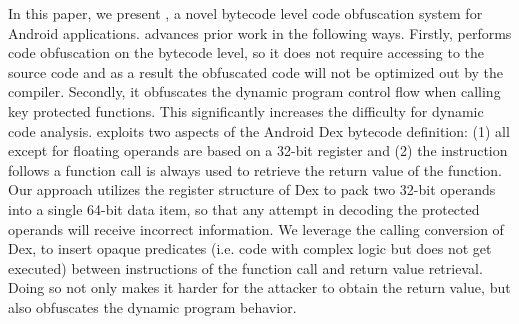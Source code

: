 %

In this paper, we present \ToolName, a novel bytecode level code obfuscation system for Android applications. \ToolName advances prior work in the following ways. Firstly, \ToolName performs code obfuscation on the bytecode level, so it does not require accessing to the source code and as a result the obfuscated code will not be optimized out by the compiler. Secondly, it obfuscates the dynamic program control flow when calling key protected functions. This significantly increases the difficulty for dynamic code analysis. \ToolName exploits two aspects of the Android Dex bytecode definition: (1) all except for floating operands are based on a 32-bit register and (2) the instruction follows a function call is always used to retrieve the return value of the function. Our approach utilizes the register structure of Dex to pack two 32-bit operands into a single 64-bit data item, so that any attempt in decoding the protected operands will receive incorrect information. We leverage the calling conversion of Dex, to insert opaque predicates (i.e. code with complex logic but does not get executed) between instructions of the function call and return value retrieval. Doing so not only makes it harder for the attacker to obtain the return value, but also obfuscates the dynamic program behavior.


